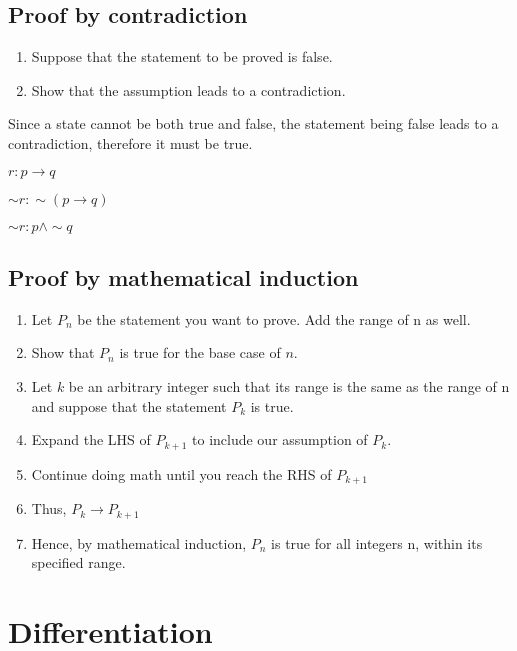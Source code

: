 \documentclass[10pt,a4paper]{article}
\begin{document}
\subsection{Proof by contradiction}
\begin{enumerate}
  \item Suppose that the statement to be proved is false.
  \item Show that the assumption leads to a contradiction.
\end{enumerate}
Since a state cannot be both true and false, the statement being false leads to a contradiction, therefore it must be true. 
\begin{center}
$r : p \rightarrow q$
\end{center}
\begin{center}
$\sim r : \sim (p \rightarrow q)$
\end{center}
\begin{center}
$\sim r : p \wedge \sim q$
\end{center}
\subsection{Proof by mathematical induction}
\begin{enumerate}
  \item Let $P_n$ be the statement you want to prove. Add the range of n as well.
  \item Show that $P_n$ is true for the base case of $n$.
  \item Let $k$ be an arbitrary integer such that its range is the same as the range of n and suppose that the statement $P_k$ is true.
  \item Expand the LHS of $P_{k+1}$ to include our assumption of $P_k$.
  \item Continue doing math until you reach the RHS of $P_{k+1}$
  \item Thus, $P_k \rightarrow P_{k+1}$ 
  \item Hence, by mathematical induction, $P_n$ is true for all integers n, within its specified range.  
\end{enumerate}

\section{Differentiation }
\vfill
{}
\end{document}
